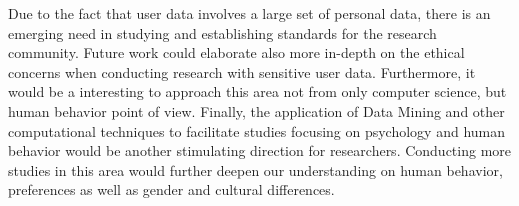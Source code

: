 Due to the fact that user data involves a large set of personal data, there is an emerging need in studying and establishing standards for the research community. Future work could elaborate also more in-depth on the ethical concerns when conducting research with sensitive user data. Furthermore, it would be a interesting to approach this area not from only computer science, but human behavior point of view. Finally, the application of Data Mining and other computational techniques to facilitate studies focusing on psychology and human behavior would be another stimulating direction for researchers. Conducting more studies in this area would further deepen our understanding on human behavior, preferences as well as gender and cultural differences. 